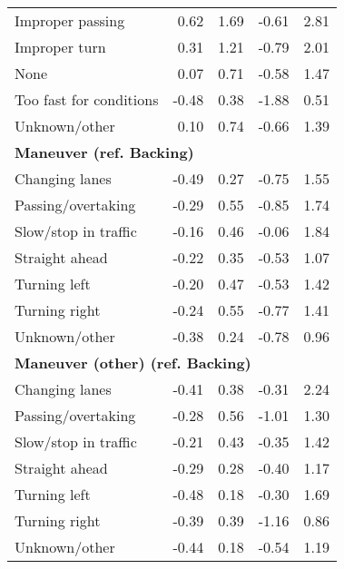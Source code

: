 \begin{tabular}{p{5cm}rrrr}
Improper passing        &             0.62 &             1.69 &             -0.61 &             2.81 \\
Improper turn           &             0.31 &             1.21 &             -0.79 &             2.01 \\
None                    &             0.07 &             0.71 &             -0.58 &             1.47 \\
Too fast for conditions &            -0.48 &             0.38 &             -1.88 &             0.51 \\
Unknown/other           &             0.10 &             0.74 &             -0.66 &             1.39 \\
\midrule
\multicolumn{5}{l}{\textbf{Maneuver (ref. Backing)}}\\\addlinespace
Changing lanes       &            -0.49 &             0.27 &             -0.75 &             1.55 \\
Passing/overtaking   &            -0.29 &             0.55 &             -0.85 &             1.74 \\
Slow/stop in traffic &            -0.16 &             0.46 &             -0.06 &             1.84 \\
Straight ahead       &            -0.22 &             0.35 &             -0.53 &             1.07 \\
Turning left         &            -0.20 &             0.47 &             -0.53 &             1.42 \\
Turning right        &            -0.24 &             0.55 &             -0.77 &             1.41 \\
Unknown/other        &            -0.38 &             0.24 &             -0.78 &             0.96 \\
\midrule
\multicolumn{5}{l}{\textbf{Maneuver (other) (ref. Backing)}}\\\addlinespace
Changing lanes       &            -0.41 &             0.38 &             -0.31 &             2.24 \\
Passing/overtaking   &            -0.28 &             0.56 &             -1.01 &             1.30 \\
Slow/stop in traffic &            -0.21 &             0.43 &             -0.35 &             1.42 \\
Straight ahead       &            -0.29 &             0.28 &             -0.40 &             1.17 \\
Turning left         &            -0.48 &             0.18 &             -0.30 &             1.69 \\
Turning right        &            -0.39 &             0.39 &             -1.16 &             0.86 \\
Unknown/other        &            -0.44 &             0.18 &             -0.54 &             1.19 \\
\bottomrule
\end{tabular}